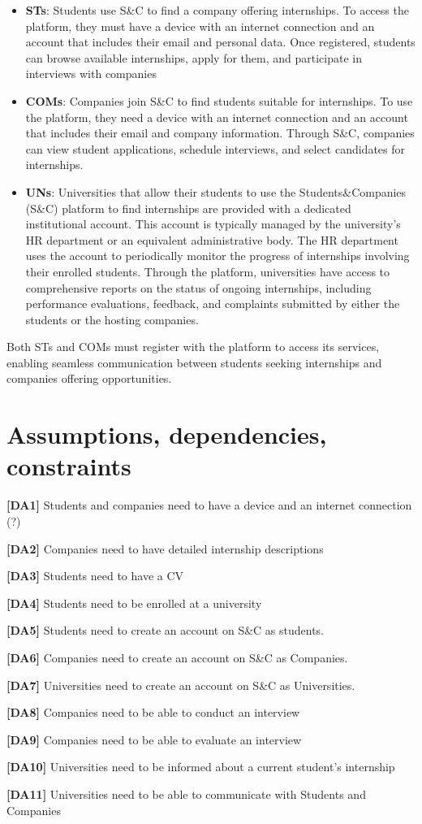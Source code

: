 \begin{itemize}
    \item \textbf{STs}: Students use S\&C to find a company offering internships. To access the platform, they must have a device with an internet connection and an account that includes their email and personal data. Once registered, students can browse available internships, apply for them, and participate in interviews with 
    companies

    \item \textbf{COMs}:  Companies join S\&C to find students suitable for internships. To use the platform, they need a device with an internet connection and an account that includes their email and company information. Through S\&C, companies can view student applications, schedule interviews, and select candidates for internships.

    \item \textbf{UNs}: Universities that allow their students to use the Students\&Companies (S\&C) platform to find internships are provided with a dedicated institutional account. This account is typically managed by the university’s HR department or an equivalent administrative body.
    The HR department uses the account to periodically monitor the progress of internships involving their enrolled students. Through the platform, universities have access to comprehensive reports on the status of ongoing internships, including performance evaluations, feedback, and complaints submitted by either the students or the hosting companies.
    
\end{itemize}

Both STs and COMs must register with the platform to access its services, enabling seamless communication between students seeking internships and companies offering opportunities.

\pagebreak
\section{Assumptions, dependencies, constraints}
\textbf{[DA1] }Students and companies need to have a device and an internet connection (?)

\textbf{[DA2]} Companies need to have detailed internship descriptions

\textbf{[DA3]} Students need to have a CV

\textbf{[DA4]} Students need to be enrolled at a university 

\textbf{[DA5]} Students need to create an account on S\&C as students.

\textbf{[DA6]} Companies need to create an account on S\&C as Companies.

\textbf{[DA7]} Universities need to create an account on S\&C as Universities.

\textbf{[DA8]} Companies need to be able to conduct an interview

\textbf{[DA9]} Companies need to be able to evaluate an interview

\textbf{[DA10]} Universities need to be informed about a current student's internship

\textbf{[DA11]} Universities need to be able to communicate with Students and Companies
